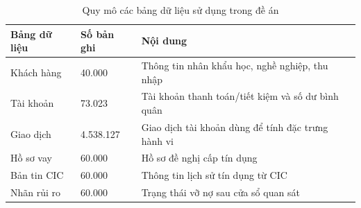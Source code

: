 \begin{table}[!htbp]
\centering
\caption{Quy mô các bảng dữ liệu sử dụng trong đề án}
\label{tab:dataset}
\small
\setlength{\tabcolsep}{5.0pt}
\begin{tabular}{@{}L{3.0cm}R{2.4cm}L{7.6cm}@{}}
\toprule
\textbf{Bảng dữ liệu} & \textbf{Số bản ghi} & \textbf{Nội dung} \\
\midrule
Khách hàng & 40.000 & Thông tin nhân khẩu học, nghề nghiệp, thu nhập \\
Tài khoản & 73.023 & Tài khoản thanh toán/tiết kiệm và số dư bình quân \\
Giao dịch & 4.538.127 & Giao dịch tài khoản dùng để tính đặc trưng hành vi \\
Hồ sơ vay & 60.000 & Hồ sơ đề nghị cấp tín dụng \\
Bản tin CIC & 60.000 & Thông tin lịch sử tín dụng từ CIC \\
Nhãn rủi ro & 60.000 & Trạng thái vỡ nợ sau cửa sổ quan sát \\
\bottomrule
\end{tabular}
\end{table}
